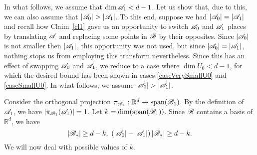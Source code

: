     In what follows, we assume that $\operatorname{dim}{\mathscr{A}}_1<d-1 $. Let us show that, due to this, we can also assume that $|\aaa_0|>|\aaa_1|$. To this end, suppose we had $|{\mathscr{A}}_0|=|{\mathscr{A}}_1|$ and recall how Claim~\ref{cl1} gave us an opportunity to switch ${\mathscr{A}}_0$ and ${\mathscr{A}}_1$ places by translating ${\mathscr{A}}$ and replacing some points in ${\mathscr{B}}$ by their opposites. Since $|{\mathscr{A}}_0|$ is not smaller then $|{\mathscr{A}}_1|$, this opportunity was not used, but since $|{\mathscr{A}}_0|=|{\mathscr{A}}_1|$, nothing stops us from employing this transform nevertheless. Since this has an effect of swapping ${\mathscr{A}}_0$ and ${\mathscr{A}}_1$, we reduce to a case where $\operatorname{dim}U_0<d-1$, for which the desired bound has been shown in cases \ref{caseVerySmallU0} and \ref{caseSmallU0}. In what follows, we assume $|{\mathscr{A}}_0| > |{\mathscr{A}}_1|$.
    

        Consider the orthogonal projection $\pi_{{\mathscr{B}}_1}:\mathbb{R}^d\rightarrow\operatorname{span}({\mathscr{B}}_1)$. By the definition of ${\mathscr{A}}_1$, we have $\left|\pi_{{\mathscr{B}}_1}({\mathscr{A}}_1)\right|=1$. Let $k=\operatorname{dim(\operatorname{span}({\mathscr{B}}_1))}$. Since ${\mathscr{B}}$ contains a basis of $\mathbb{R}^d$, we have
        \begin{equation}\label{A_dif_B_star}
            \left|\bb_*\right|\geq d-k ,\ 
            \left(\left|\aaa_0\right|-\left|\aaa_1\right|\right)\left|\bb_*\right| \geq d-k.
        \end{equation}
        We will now deal with possible values of $k$.
